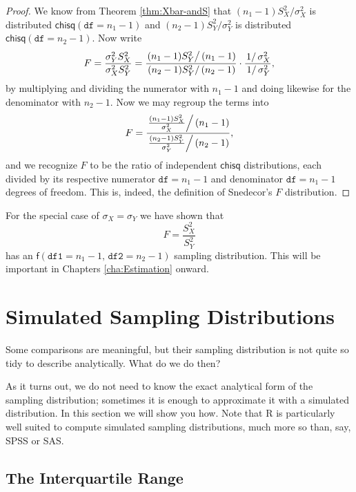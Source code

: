 \documentclass[captions=tableheading]{scrbook}
\begin{document}
\begin{proof}
We know from Theorem \ref{thm:Xbar-andS} that \((n_{1}-1)S_{X}^{2}/\sigma_{X}^{2}\) is distributed \(\mathsf{chisq}(\mathtt{df}=n_{1}-1)\) and \((n_{2}-1)S_{Y}^{2}/\sigma_{Y}^{2}\) is distributed \(\mathsf{chisq}(\mathtt{df}=n_{2}-1)\). Now write
\[
F=\frac{\sigma_{Y}^{2}S_{X}^{2}}{\sigma_{X}^{2}S_{Y}^{2}}=\frac{\left.(n_{1}-1)S_{Y}^{2}\right\slash (n_{1}-1)}{\left.(n_{2}-1)S_{Y}^{2}\right\slash (n_{2}-1)}\cdot\frac{\left.1\right\slash \sigma_{X}^{2}}{\left.1\right\slash \sigma_{Y}^{2}},
\]
by multiplying and dividing the numerator with \(n_{1}-1\) and doing likewise for the denominator with \(n_{2}-1\). Now we may regroup the terms into
\[
F=\frac{\left.\frac{(n_{1}-1)S_{X}^{2}}{\sigma_{X}^{2}}\right\slash (n_{1}-1)}{\left.\frac{(n_{2}-1)S_{Y}^{2}}{\sigma_{Y}^{2}}\right\slash (n_{2}-1)},
\]
and we recognize \(F\) to be the ratio of independent \(\mathsf{chisq}\) distributions, each divided by its respective numerator \(\mathtt{df}=n_{1}-1\) and denominator \(\mathtt{df}=n_{1}-1\) degrees of freedom. This is, indeed, the definition of Snedecor's \(F\) distribution. 
\end{proof}

\begin{rem}
For the special case of \(\sigma_{X}=\sigma_{Y}\) we have shown that
\begin{equation}
F=\frac{S_{X}^{2}}{S_{Y}^{2}}
\end{equation}
has an \(\mathsf{f}(\mathtt{df1}=n_{1}-1,\,\mathtt{df2}=n_{2}-1)\) sampling distribution. This will be important in Chapters \ref{cha:Estimation} onward.
\end{rem}
\section{Simulated Sampling Distributions}
\label{sec-8-5}

\label{sec:Simulated-Sampling-Distributions}

Some comparisons are meaningful, but their sampling distribution is not quite so tidy to describe analytically. What do we do then?

As it turns out, we do not need to know the exact analytical form of the sampling distribution; sometimes it is enough to approximate it with a simulated distribution. In this section we will show you how. Note that \textsf{R} is particularly well suited to compute simulated sampling distributions, much more so than, say, SPSS or SAS.
\subsection{The Interquartile Range}
\label{sec-8-5-1}
\end{document}
